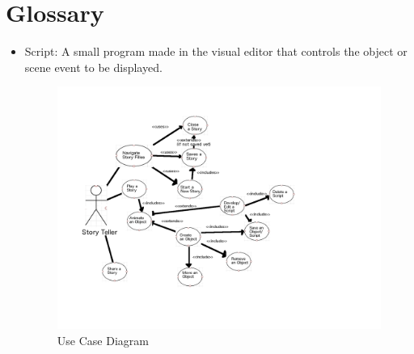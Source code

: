 \documentclass[12pt]{article}
\begin{document}
\section{Glossary}
\begin{itemize}
\item Script:  A small program made in the visual editor that controls the object or scene event to be displayed.


\begin{figure}[ht!]
\centering
\includegraphics[width=200mm]{Story Creator FlowChart.png}
\caption{Use Case Diagram}
\label{overflow}
\end{figure}






\end{itemize}
\end{document}
